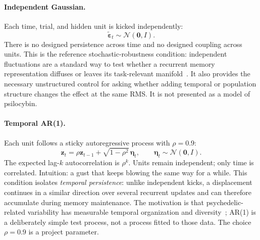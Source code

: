 \documentclass[aps,preprint,amsmath,amssymb,nofootinbib,floatfix]{revtex4-2}
\begin{document}
\paragraph{Independent Gaussian.}
Each time, trial, and hidden unit is kicked independently:
\begin{equation}
\tilde{\boldsymbol{\varepsilon}}_t \sim \mathcal{N}(\mathbf{0},I).
\end{equation}
There is no designed persistence across time and no designed coupling across units. This is the reference stochastic-robustness condition: independent fluctuations are a standard way to test whether a recurrent memory representation diffuses or leaves its task-relevant manifold~\cite{kilpatrick2013,ghazizadeh2021}. It also provides the necessary unstructured control for asking whether adding temporal or population structure changes the effect at the same RMS. It is not presented as a model of psilocybin.

\paragraph{Temporal AR(1).}
Each unit follows a sticky autoregressive process with $\rho=0.9$:
\begin{equation}
\mathbf{z}_t = \rho\mathbf{z}_{t-1} + \sqrt{1-\rho^2}\,\boldsymbol{\eta}_t,
\qquad \boldsymbol{\eta}_t\sim\mathcal{N}(\mathbf{0},I).
\end{equation}
The expected lag-$k$ autocorrelation is $\rho^k$. Units remain independent; only time is correlated. Intuition: a gust that keeps blowing the same way for a while. This condition isolates \emph{temporal persistence}: unlike independent kicks, a displacement continues in a similar direction over several recurrent updates and can therefore accumulate during memory maintenance. The motivation is that psychedelic-related variability has measurable temporal organization and diversity~\cite{schartner2017,stoliker2026}; AR(1) is a deliberately simple test process, not a process fitted to those data. The choice $\rho=0.9$ is a project parameter.
\end{document}
